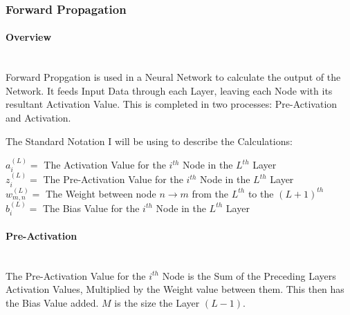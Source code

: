 \begin{flushleft}
            \subsubsection{Forward Propagation}
                \paragraph{Overview} \mbox{} \\
                    \vspace{0.2cm}
                    Forward Propgation is used in a Neural Network to calculate the output of the Network. It feeds Input Data through each
                    Layer, leaving each Node with its resultant Activation Value. This is completed in two processes: Pre-Activation and Activation. \\
                    \vspace{0.4cm}
                    \centerline{The Standard Notation I will be using to describe the Calculations:}

                    \vspace{0.2cm}
                    \begin{addmargin}[2em]{0em}                     
                        $a^{(L)}_{i} = $ The Activation Value for the $i^{th}$ Node in the $L^{th}$ Layer \\
                        $z^{(L)}_{i} = $ The Pre-Activation Value for the $i^{th}$ Node in the $L^{th}$ Layer \\
                        $w^{(L)}_{m,n} = $ The Weight between node $n \rightarrow m$ from the $L^{th}$ to the $(L + 1)^{th}$ \\
                        $b^{(L)}_{i} = $ The Bias Value for the $i^{th}$ Node in the $L^{th}$ Layer \\
                    \end{addmargin}
                    \vspace{0.4cm}

                \paragraph{Pre-Activation} \mbox{} \\
                    \vspace{0.2cm}
                    The Pre-Activation Value for the $i^{th}$ Node is the Sum of the Preceding Layers Activation Values, Multiplied by the Weight value
                    between them. This then has the Bias Value added. $M$ is the size the Layer $(L - 1)$.


\end{flushleft}
